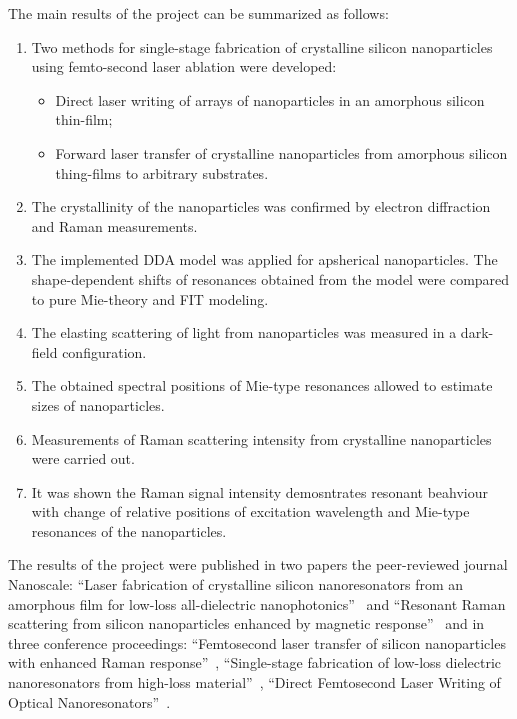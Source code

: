     \clearpage
    The main results of the project can be summarized as follows:
    \begin{enumerate}
        \item Two methods for single-stage fabrication of crystalline silicon nanoparticles using femto-second laser ablation were developed:
            \begin{itemize}
                \item Direct laser writing of arrays of nanoparticles in an amorphous silicon thin-film;
                \item Forward laser transfer of crystalline nanoparticles from amorphous silicon thing-films to arbitrary substrates.
            \end{itemize}
        \item The crystallinity of the nanoparticles was confirmed by electron diffraction and Raman measurements.
        \item The implemented DDA model was applied for apsherical nanoparticles.  The shape-dependent shifts of resonances
                obtained from the model were compared to pure Mie-theory and FIT modeling.
        \item The elasting scattering of light from nanoparticles was measured in a dark-field configuration.
        \item The obtained spectral positions of Mie-type resonances allowed to estimate sizes of nanoparticles.
        \item Measurements of Raman scattering intensity from crystalline nanoparticles were carried out.
        \item It was shown the Raman signal intensity demosntrates resonant beahviour with change of
                relative positions of excitation wavelength and Mie-type resonances of the nanoparticles.
    \end{enumerate}

        The results of the project were published in two papers the peer-reviewed journal Nanoscale: ``Laser fabrication of
    crystalline silicon nanoresonators from an amorphous film for low-loss all-dielectric nanophotonics''~ and
    ``Resonant Raman scattering from silicon nanoparticles enhanced by magnetic response''~ and in
    three conference proceedings: ``Femtosecond laser transfer of silicon nanoparticles with enhanced Raman response''~,
    ``Single-stage fabrication of low-loss dielectric nanoresonators from high-loss material''~,
    ``Direct Femtosecond Laser Writing of Optical Nanoresonators''~.

\clearpage
